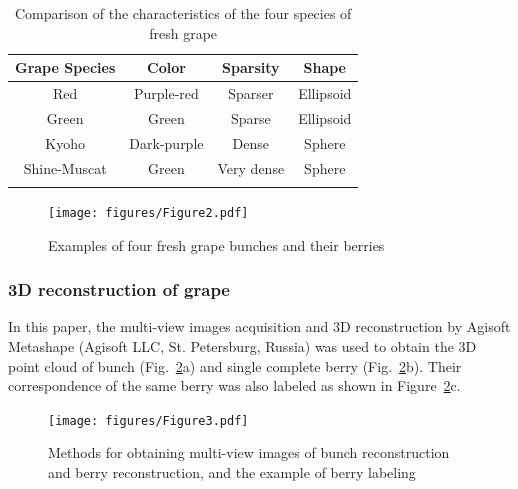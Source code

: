 \documentclass[12pt]{article}
\begin{document}
\begin{table}[h]
    \centering
    \caption{Comparison of the characteristics of the four species of fresh grape}
    \begin{tabular}{cccc}
        \hline
        \textbf{Grape Species} & \textbf{Color} & \textbf{Sparsity} & \textbf{Shape} \\
        \hline
        Red & Purple-red & Sparser & Ellipsoid \\
        Green & Green & Sparse & Ellipsoid \\
        Kyoho & Dark-purple & Dense & Sphere \\
        Shine-Muscat & Green & Very dense & Sphere \\
        \hline
    \label{tbl:1}
    \end{tabular}
\end{table}

\begin{figure}[hbt!]
    \centering
    \texttt{[image: figures/Figure2.pdf]}
    \caption{Examples of four fresh grape bunches and their berries}
    \label{fig:raw86}
\end{figure}

\subsubsection{3D reconstruction of grape}
\label{sec:212}

In this paper, the multi-view images acquisition and 3D reconstruction by Agisoft Metashape (Agisoft LLC, St. Petersburg, Russia) was used to obtain the 3D point cloud of bunch (Fig.~\ref{fig:raw9}a) and single complete berry (Fig.~\ref{fig:raw9}b). 
Their correspondence of the same berry was also labeled as shown in Figure~\ref{fig:raw9}c.

\begin{figure}[hbt!]
    \centering
    \texttt{[image: figures/Figure3.pdf]}
    \caption{Methods for obtaining multi-view images of bunch reconstruction and berry reconstruction, and the example of berry labeling}
    \label{fig:raw9}
\end{figure}
\end{document}
